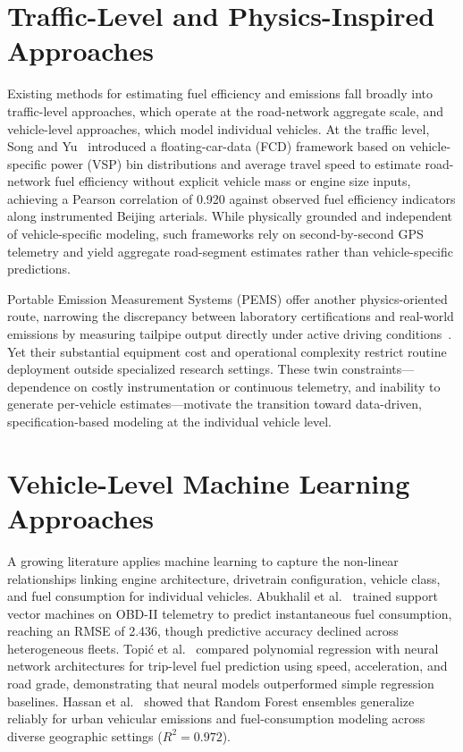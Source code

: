\section{Traffic-Level and Physics-Inspired Approaches}

Existing methods for estimating fuel efficiency and emissions fall broadly into traffic-level approaches, which operate at the road-network aggregate scale, and vehicle-level approaches, which model individual vehicles. At the traffic level, Song and Yu~\cite{song2009estimation} introduced a floating-car-data (FCD) framework based on vehicle-specific power (VSP) bin distributions and average travel speed to estimate road-network fuel efficiency without explicit vehicle mass or engine size inputs, achieving a Pearson correlation of 0.920 against observed fuel efficiency indicators along instrumented Beijing arterials. While physically grounded and independent of vehicle-specific modeling, such frameworks rely on second-by-second GPS telemetry and yield aggregate road-segment estimates rather than vehicle-specific predictions.

Portable Emission Measurement Systems (PEMS) offer another physics-oriented route, narrowing the discrepancy between laboratory certifications and real-world emissions by measuring tailpipe output directly under active driving conditions~\cite{mkadziel2024instantaneous}. Yet their substantial equipment cost and operational complexity restrict routine deployment outside specialized research settings. These twin constraints---dependence on costly instrumentation or continuous telemetry, and inability to generate per-vehicle estimates---motivate the transition toward data-driven, specification-based modeling at the individual vehicle level.

\section{Vehicle-Level Machine Learning Approaches}

A growing literature applies machine learning to capture the non-linear relationships linking engine architecture, drivetrain configuration, vehicle class, and fuel consumption for individual vehicles. Abukhalil et al.~\cite{abukhalil2020fuel} trained support vector machines on OBD-II telemetry to predict instantaneous fuel consumption, reaching an RMSE of 2.436, though predictive accuracy declined across heterogeneous fleets. Topić et al.~\cite{topic2022neural} compared polynomial regression with neural network architectures for trip-level fuel prediction using speed, acceleration, and road grade, demonstrating that neural models outperformed simple regression baselines. Hassan et al.~\cite{hassan2023random} showed that Random Forest ensembles generalize reliably for urban vehicular emissions and fuel-consumption modeling across diverse geographic settings ($R^2 = 0.972$).

